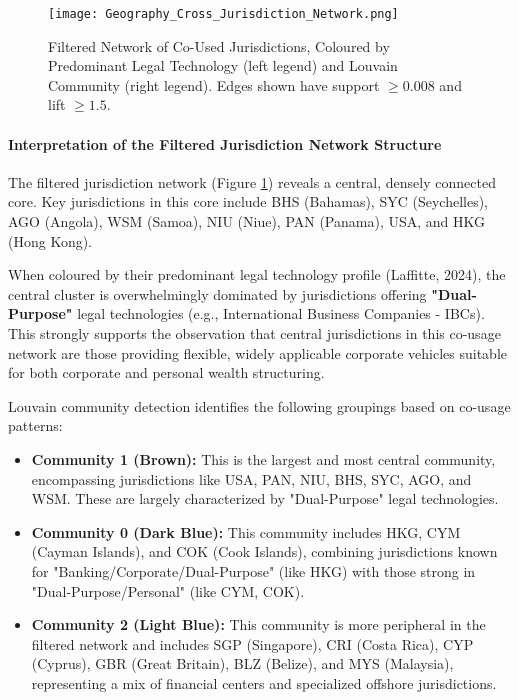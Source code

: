 \begin{figure}[htbp]
    \centering
    \texttt{[image: Geography\_Cross\_Jurisdiction\_Network.png]}
    \caption{Filtered Network of Co-Used Jurisdictions, Coloured by Predominant Legal Technology (left legend) and Louvain Community (right legend). Edges shown have support $\ge 0.008$ and lift $\ge 1.5$.}
    \label{fig:geography_cross_jurisdiction_network}
\end{figure}

\paragraph{Interpretation of the Filtered Jurisdiction Network Structure}
The filtered jurisdiction network (Figure \ref{fig:geography_cross_jurisdiction_network}) reveals a central, densely connected core. Key jurisdictions in this core include BHS (Bahamas), SYC (Seychelles), AGO (Angola), WSM (Samoa), NIU (Niue), PAN (Panama), USA, and HKG (Hong Kong).

When coloured by their predominant legal technology profile (Laffitte, 2024), the central cluster is overwhelmingly dominated by jurisdictions offering \textbf{"Dual-Purpose"} legal technologies (e.g., International Business Companies - IBCs). This strongly supports the observation that central jurisdictions in this co-usage network are those providing flexible, widely applicable corporate vehicles suitable for both corporate and personal wealth structuring. 

Louvain community detection identifies the following groupings based on co-usage patterns:
\begin{itemize}
    \item \textbf{Community 1 (Brown):} This is the largest and most central community, encompassing jurisdictions like USA, PAN, NIU, BHS, SYC, AGO, and WSM. These are largely characterized by "Dual-Purpose" legal technologies.
    \item \textbf{Community 0 (Dark Blue):} This community includes HKG, CYM (Cayman Islands), and COK (Cook Islands), combining jurisdictions known for "Banking/Corporate/Dual-Purpose" (like HKG) with those strong in "Dual-Purpose/Personal" (like CYM, COK).
    \item \textbf{Community 2 (Light Blue):} This community is more peripheral in the filtered network and includes SGP (Singapore), CRI (Costa Rica), CYP (Cyprus), GBR (Great Britain), BLZ (Belize), and MYS (Malaysia), representing a mix of financial centers and specialized offshore jurisdictions.
\end{itemize}

